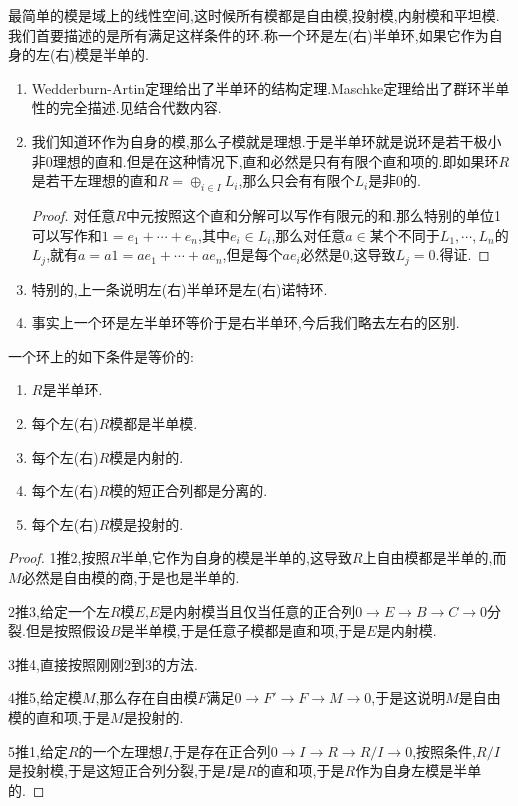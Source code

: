 最简单的模是域上的线性空间,这时候所有模都是自由模,投射模,内射模和平坦模.我们首要描述的是所有满足这样条件的环.称一个环是左(右)半单环,如果它作为自身的左(右)模是半单的.
\begin{enumerate}
	\item Wedderburn-Artin定理给出了半单环的结构定理.Maschke定理给出了群环半单性的完全描述.见结合代数内容.
	\item 我们知道环作为自身的模,那么子模就是理想.于是半单环就是说环是若干极小非0理想的直和.但是在这种情况下,直和必然是只有有限个直和项的.即如果环$R$是若干左理想的直和$R=\oplus_{i\in I}L_i$,那么只会有有限个$L_i$是非0的.
	\begin{proof}
		
		对任意$R$中元按照这个直和分解可以写作有限元的和.那么特别的单位1可以写作和$1=e_1+\cdots+e_n$,其中$e_i\in L_i$,那么对任意$a\in$某个不同于$L_1,\cdots,L_n$的$L_j$,就有$a=a1=ae_1+\cdots+ae_n$,但是每个$ae_i$必然是0,这导致$L_j=0$.得证.
	\end{proof}
    \item 特别的,上一条说明左(右)半单环是左(右)诺特环.
    \item 事实上一个环是左半单环等价于是右半单环,今后我们略去左右的区别.
\end{enumerate}

一个环上的如下条件是等价的:
\begin{enumerate}
	\item $R$是半单环.
	\item 每个左(右)$R$模都是半单模.
	\item 每个左(右)$R$模是内射的.
	\item 每个左(右)$R$模的短正合列都是分离的.
	\item 每个左(右)$R$模是投射的.
\end{enumerate}
\begin{proof}
	
	1推2,按照$R$半单,它作为自身的模是半单的,这导致$R$上自由模都是半单的,而$M$必然是自由模的商,于是也是半单的.
	
	2推3,给定一个左$R$模$E$,$E$是内射模当且仅当任意的正合列$0\to E\to B\to C\to0$分裂.但是按照假设$B$是半单模,于是任意子模都是直和项,于是$E$是内射模.
	
	3推4,直接按照刚刚2到3的方法.
	
	4推5,给定模$M$,那么存在自由模$F$满足$0\to F'\to F\to M\to 0$,于是这说明$M$是自由模的直和项,于是$M$是投射的.
	
	5推1,给定$R$的一个左理想$I$,于是存在正合列$0\to I\to R\to R/I\to0$,按照条件,$R/I$是投射模,于是这短正合列分裂,于是$I$是$R$的直和项,于是$R$作为自身左模是半单的.
\end{proof}

